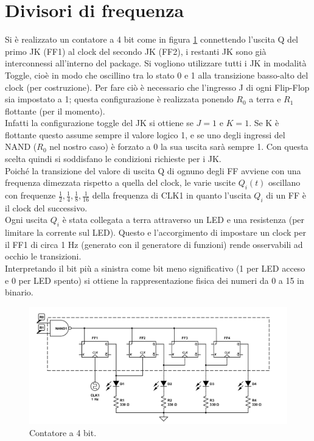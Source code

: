 \documentclass[10pt,a4paper]{article}
\begin{document}
\section{Divisori di frequenza}
Si è realizzato un contatore a 4 bit come in figura \ref{contatore} connettendo l'uscita Q del primo JK (FF1) al clock del secondo JK (FF2), i restanti JK sono già interconnessi all'interno del package. Si vogliono utilizzare tutti i JK in modalità Toggle, cioè in modo che oscillino tra lo stato 0 e 1 alla transizione basso-alto del clock (per costruzione). Per fare ciò è necessario che l'ingresso J di ogni Flip-Flop sia impostato a 1; questa configurazione è realizzata ponendo $R_0$ a terra e $R_1$ flottante (per il momento).\\
Infatti la configurazione toggle del JK si ottiene se $J = 1$ e $K = 1$. Se K è flottante questo assume sempre il valore logico 1, e se uno degli ingressi del NAND ($R_0$ nel nostro caso) è forzato a 0 la sua uscita sarà sempre 1. Con questa scelta quindi si soddisfano le condizioni richieste per i JK.\\  
Poiché la transizione del valore di uscita Q di ognuno degli FF avviene con una frequenza dimezzata rispetto a quella del clock, le varie uscite $Q_i(t)$ oscillano con frequenze $\frac{1}{2}, \frac{1}{4}, \frac{1}{8}, \frac{1}{16}$ della frequenza di CLK1 in quanto l'uscita $Q_i$ di un FF è il clock del successivo.\\
Ogni uscita $Q_i$ è stata collegata a terra attraverso un LED e una resistenza (per limitare la corrente sul LED). Questo e l'accorgimento di impostare un clock per il FF1 di circa 1 Hz (generato con il generatore di funzioni) %
 rende osservabili ad occhio le transizioni.\\
Interpretando il bit più a sinistra come bit meno significativo (1 per LED acceso e 0 per LED spento) si ottiene la rappresentazione fisica dei numeri da 0 a 15 in binario.\\

\begin{figure}
\centering
\includegraphics[scale=0.5]{divisore.png}
\caption{Contatore a 4 bit.\label{contatore}}
\end{figure}
\end{document}
